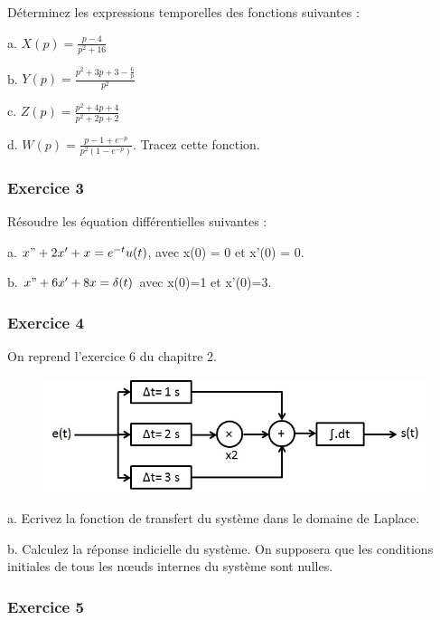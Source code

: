 	Déterminez les expressions temporelles des fonctions suivantes :
	
	a. $X(p)=\frac{p-4}{p^{2}+16}$ 
	
	b. $Y(p) = \frac{p^{2}+3p+3-\frac{6}{p}}{p^{2}}$ 
	
	c. $Z(p) = \frac{p^{2}+4p+4}{p^{2}+2p+2}$
	
	d. $W(p) = \frac{p-1+e^{-p}}{p^{2}(1-e^{-p})}$. Tracez cette fonction.
	
	
	\vspace{1\baselineskip}
	
	\subsubsection{Exercice 3}
	
	Résoudre les équation différentielles suivantes :
	
	a. $x"+2x'+x=e^{-t}u(t)$, avec x(0) = 0 et x'(0) = 0. 
	
	b. $x"+6x'+8x=\delta(t)$ avec x(0)=1 et x'(0)=3. 
	
	\vspace{1\baselineskip}
	
	
	\subsubsection{Exercice 4}
	
	On reprend l'exercice 6 du chapitre 2.

	
	\begin{figure}[h!]
		\centering
		\includegraphics[scale=0.5]{images/Exo_2_6.jpg} 
	\end{figure}
	
	a. Ecrivez la fonction de transfert du système dans le domaine de Laplace.
	
	b. Calculez la réponse indicielle du système. On supposera que les conditions initiales de tous les nœuds internes du système sont nulles. 
	
	
	\vspace{1\baselineskip}
	
	\subsubsection{Exercice 5}
	
